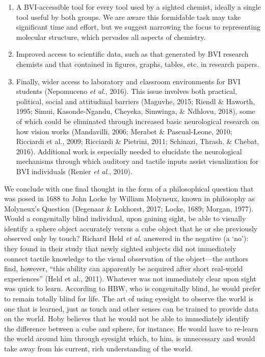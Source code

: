 \documentclass[11.5pt]{sig-alternate} %
\begin{document}
\begin{large}
\begin{enumerate}
    \item A BVI-accessible tool for every tool used by a sighted chemist, ideally a single tool useful by both groups. We are aware this formidable task may take significant time and effort, but we suggest narrowing the focus to representing molecular structure, which pervades all aspects of chemistry.
    \item Improved access to scientific data, such as that generated by BVI research chemists and that contained in figures, graphs, tables, etc. in research papers.
    \item Finally, wider access to laboratory and classroom environments for BVI students (Nepomuceno \textit{et al}., 2016). This issue involves both practical, political, social and attitudinal barriers (Maguvhe, 2015; Riendl \& Haworth, 1995; Simui, Kasonde-Ngandu, Cheyeka, Simwinga, \& Ndhlovu, 2018), some of which could be eliminated through increased basic neurological research on how vision works (Mandavilli, 2006; Merabet \& Pascual-Leone, 2010; Ricciardi et al., 2009; Ricciardi \& Pietrini, 2011; Schinazi, Thrash, \& Chebat, 2016). Additional work is especially needed to elucidate the neurological mechanisms through which auditory and tactile inputs assist visualization for BVI individuals (Renier \textit{et al}., 2010).
\end{enumerate}

We conclude with one final thought in the form of a philosophical question that was posed in 1688 to John Locke by William Molyneux, known in philosophy as Molyneux’s Question (Degenaar \& Lokhorst, 2017; Locke, 1689; Morgan, 1977). Would a congenitally blind individual, upon gaining sight, be able to visually identify a sphere object accurately versus a cube object that he or she previously observed only by touch? Richard Held \textit{et al}. answered in the negative (a ‘no’): they found in their study that newly sighted subjects did not immediately connect tactile knowledge to the visual observation of the object—the authors find, however, “this ability can apparently be acquired after short real-world experiences” (Held et al., 2011). Whatever was not immediately clear upon sight was quick to learn. According to HBW, who is congenitally blind, he would prefer to remain totally blind for life. The art of using eyesight to observe the world is one that is learned, just as touch and other senses can be trained to provide data on the world. Hoby believes that he would not be able to immediately identify the difference between a cube and sphere, for instance. He would have to re-learn the world around him through eyesight which, to him, is unnecessary and would take away from his current, rich understanding of the world.


\end{large}
\end{document}
